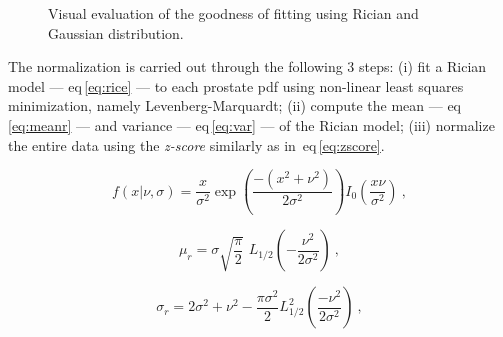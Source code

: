 \begin{figure}
  \centering
  \hfill
  \hfill
  \caption{Visual evaluation of the goodness of fitting using Rician and Gaussian distribution.}
  \label{fig:fitting}
\end{figure}

The normalization is carried out through the following 3 steps: 
(i) fit a Rician model --- \acs{eq}\,\eqref{eq:rice} --- to each prostate \ac{pdf} using non-linear least squares minimization, namely Levenberg-Marquardt; 
(ii) compute the mean --- \acs{eq}\,\eqref{eq:meanr} --- and variance --- \acs{eq}\,\eqref{eq:var} --- of the Rician model;
(iii) normalize the entire data using the \textit{z-score} similarly as in~\acs{eq}\,\eqref{eq:zscore}.

\begin{equation}
  f(x| \nu, \sigma) = \frac{x}{\sigma^2}\exp\left( \frac{- (x^2 + \nu^2)}{2\sigma^2} \right) I_0 \left( \frac{x \nu}{\sigma^2} \right) \ ,
  \label{eq:rice}
\end{equation}

\begin{equation}
  \mu_{r} = \sigma  \sqrt{\frac{\pi}{2}}\,\,L_{1/2}(-\frac{\nu^2}{2\sigma^2})  \ ,
  \label{eq:meanr}
\end{equation}

\begin{equation}
  \sigma_{r} = 2\sigma^2+\nu^2-\frac{\pi\sigma^2}{2}L_{1/2}^2\left(\frac{-\nu^2}{2\sigma^2}\right)  \ ,
  \label{eq:var}
\end{equation}

